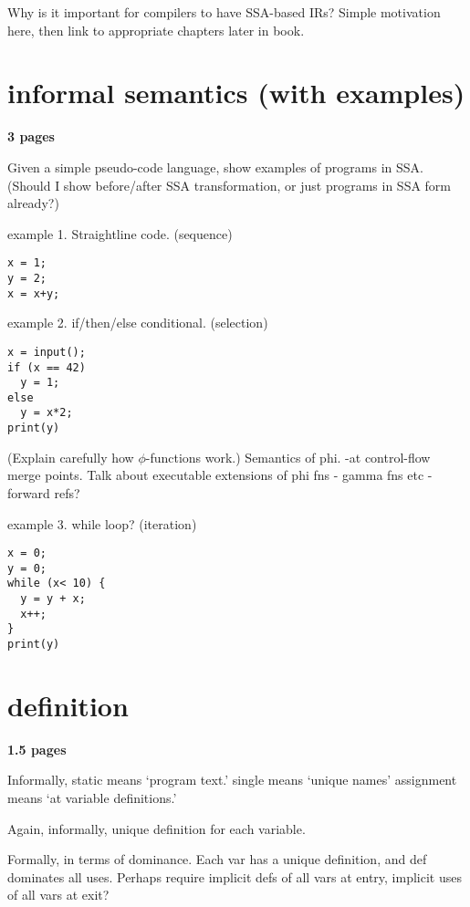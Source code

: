 Why is it important for compilers to have SSA-based IRs? Simple motivation
here, then link to appropriate chapters later in book.




\section{informal semantics (with examples)}

\textbf{3 pages}

Given a simple pseudo-code language, show examples of programs in SSA.
(Should I show before/after SSA transformation, or just programs
in SSA form already?)

example 1. Straightline code. (sequence)

\begin{verbatim}
x = 1;
y = 2;
x = x+y;
\end{verbatim}

example 2. if/then/else conditional.  (selection)

\begin{verbatim}
x = input();
if (x == 42)
  y = 1;
else
  y = x*2;
print(y)
\end{verbatim}

(Explain carefully how $\phi$-functions work.) 
Semantics of phi. -at control-flow merge points.
Talk about executable extensions of phi fns - gamma fns etc - 
forward refs?

example 3. while loop? (iteration)

\begin{verbatim}
x = 0;
y = 0;
while (x< 10) {
  y = y + x;
  x++;
}
print(y)
\end{verbatim}


\section{definition}

\textbf{1.5 pages}

Informally, static means `program text.'
single means `unique names'
assignment means `at variable definitions.'

Again, informally, unique definition for each variable.

Formally, in terms of dominance. Each var has a unique
definition, and def dominates all uses.
Perhaps require implicit defs of all vars at entry,
implicit uses of all vars at exit?

